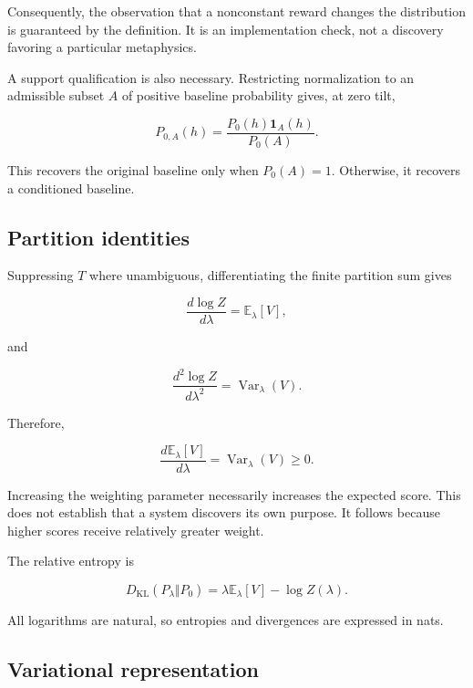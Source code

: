 \documentclass[11pt]{article}
\theoremstyle{remark}
\newcommand{\KL}{D_{\mathrm{KL}}}
\newcommand{\E}{\mathbb{E}}
\newcommand{\ind}{\mathbf{1}}
\begin{document}
Consequently, the observation that a nonconstant reward changes the distribution is guaranteed by the definition. It is an implementation check, not a discovery favoring a particular metaphysics.

A support qualification is also necessary. Restricting normalization to an admissible subset \(A\) of positive baseline probability gives, at zero tilt,

\begin{equation}
P_{0,A}(h)
=
\frac{P_0(h)\ind_A(h)}{P_0(A)}.
\end{equation}

This recovers the original baseline only when \(P_0(A)=1\). Otherwise, it recovers a conditioned baseline.

\subsection{Partition identities}

Suppressing \(T\) where unambiguous, differentiating the finite partition sum gives

\begin{equation}
\frac{d\log Z}{d\lambda}
=
\E_\lambda[V],
\end{equation}

and

\begin{equation}
\frac{d^2\log Z}{d\lambda^2}
=
\operatorname{Var}_\lambda(V).
\end{equation}

Therefore,

\begin{equation}
\frac{d\E_\lambda[V]}{d\lambda}
=
\operatorname{Var}_\lambda(V)\ge0.
\end{equation}

Increasing the weighting parameter necessarily increases the expected score. This does not establish that a system discovers its own purpose. It follows because higher scores receive relatively greater weight.

The relative entropy is

\begin{equation}
\KL(P_\lambda\Vert P_0)
=
\lambda\E_\lambda[V]-\log Z(\lambda).
\end{equation}

All logarithms are natural, so entropies and divergences are expressed in nats.

\subsection{Variational representation}
\end{document}
